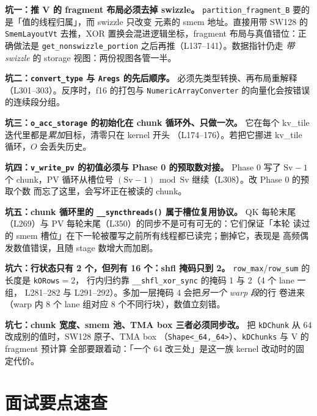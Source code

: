 \textbf{坑一：推 V 的 fragment 布局必须去掉 swizzle。}
\texttt{partition\_\allowbreak{}fragment\_\allowbreak{}B} 要的是「值的线程归属」，而 swizzle 只改变
元素的 smem 地址。直接用带 SW128 的 \texttt{Smem\allowbreak{}Layout\allowbreak{}Vt} 去推，XOR
置换会混进逻辑坐标，fragment 布局与真值错位：正确做法是
\texttt{get\_\allowbreak{}nonswizzle\_\allowbreak{}portion} 之后再推（L137--141）。数据指针仍走
\emph{带 swizzle} 的 storage 视图：两份视图各管一半。

\textbf{坑二：\texttt{convert\_\allowbreak{}type} 与 \texttt{Aregs} 的先后顺序。}
必须先类型转换、再布局重解释（L301--303）。反序时，f16 的打包与
\texttt{Numeric\allowbreak{}Array\allowbreak{}Converter} 的向量化会按错误的连续段分组。

\textbf{坑三：\texttt{o\_\allowbreak{}acc\_\allowbreak{}storage} 的初始化在 chunk 循环外、只做一次。}
它在每个 kv\_tile 迭代里都是\emph{累加}目标，清零只在 kernel 开头
（L174--176）。若把它挪进 kv\_tile 循环，$O$ 会丢失历史。

\textbf{坑四：\texttt{v\_write\_pv} 的初值必须与 Phase 0 的预取数对接。}
Phase 0 写了 $\mathrm{Sv}-1$ 个 chunk，PV 循环从槽位号
$(\mathrm{Sv}-1)\bmod \mathrm{Sv}$ 继续（L308）。改 Phase 0 的预取个数
而忘了这里，会写坏正在被读的 chunk。

\textbf{坑五：chunk 循环里的 \texttt{\_\allowbreak{}\_\allowbreak{}syncthreads\allowbreak{}()} 属于槽位复用协议。}
QK 每轮末尾（L269）与 PV 每轮末尾（L350）的同步不是可有可无的：它们保证「本轮
读过的 smem 槽位」在下一轮被覆写之前所有线程都已读完；删掉它，表现是
高频偶发数值错误，且随 stage 数增大而加剧。

\textbf{坑六：行状态只有 2 个，但列有 16 个：shfl 掩码只到 2。}
\texttt{row\_max}/\texttt{row\_sum} 的长度是 \texttt{kORows}$=2$，
行内归约靠 \texttt{\_\allowbreak{}\_\allowbreak{}shfl\_\allowbreak{}xor\_\allowbreak{}sync} 的掩码 1 与 2（4 个 lane 一组，
L281--282 与 L291--292）。多加一层掩码 4 会把\emph{另一个 warp 段}的行
卷进来（warp 内 8 个 lane 组对应 8 个不同行块），数值立刻错。

\textbf{坑七：chunk 宽度、smem 池、TMA box 三者必须同步改。}
把 \texttt{kDChunk} 从 64 改成别的值时，SW128 原子、TMA box
（\texttt{Shape\allowbreak{}<\_\allowbreak{}64,\allowbreak{}\_\allowbreak{}64>}）、\texttt{kDChunks} 与 V 的 fragment 预计算
全部要跟着动：「一个 64 改三处」是这一族 kernel 改动时的固定代价。

\section{面试要点速查}

